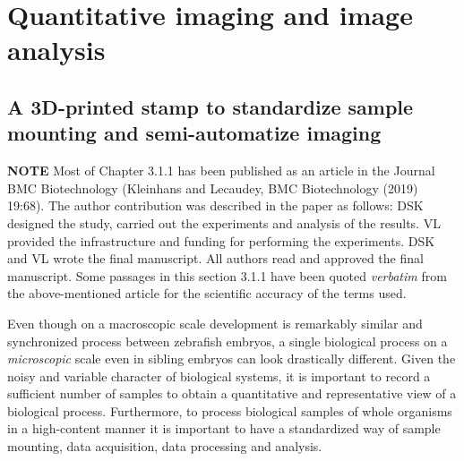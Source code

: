 \documentclass[11pt,singlespacinge,twoside]{reedthesis} %
\theoremstyle{definition}
\theoremstyle{definition}
\theoremstyle{definition}
\theoremstyle{remark}
\begin{document}
\hypertarget{res-met}{%
\section{Quantitative imaging and image analysis}\label{res-met}}

\hypertarget{res-mount}{%
\subsection{A 3D-printed stamp to standardize sample mounting and semi-automatize imaging}\label{res-mount}}
\begin{tcolorbox}[colback = white, sharp corners = northwest]
\textbf{NOTE}
\tcblower
Most of Chapter 3.1.1 has been published as an article in the Journal BMC Biotechnology (Kleinhans and Lecaudey, BMC Biotechnology (2019) 19:68). The author contribution was described in the paper as follows: DSK designed the study, carried out the experiments and analysis of the results. VL provided the infrastructure and funding for performing the experiments. DSK and VL wrote the final manuscript. All authors read and approved the final manuscript. 
Some passages in this section 3.1.1 have been quoted \textit{verbatim} from the above-mentioned article for the scientific accuracy of the terms used.
\end{tcolorbox}
Even though on a macroscopic scale development is remarkably similar and synchronized process between zebrafish embryos, a single biological process on a \emph{microscopic} scale even in sibling embryos can look drastically different. Given the noisy and variable character of biological systems, it is important to record a sufficient number of samples to obtain a quantitative and representative view of a biological process. Furthermore, to process biological samples of whole organisms in a high-content manner it is important to have a standardized way of sample mounting, data acquisition, data processing and analysis.
\end{document}
